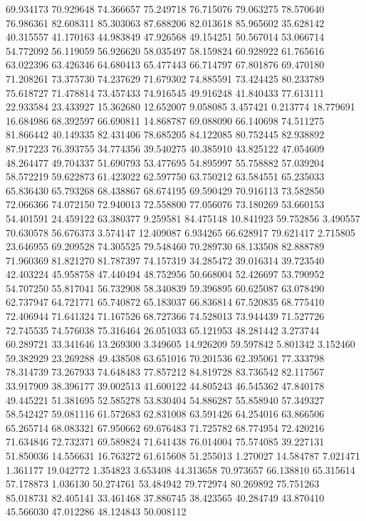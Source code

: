 69.934173
70.929648
74.366657
75.249718
76.715076
79.063275
78.570640
76.986361
82.608311
85.303063
87.688206
82.013618
85.965602
35.628142
40.315557
41.170163
44.983849
47.926568
49.154251
50.567014
53.066714
54.772092
56.119059
56.926620
58.035497
58.159824
60.928922
61.765616
63.022396
63.426346
64.680413
65.477443
66.714797
67.801876
69.470180
71.208261
73.375730
74.237629
71.679302
74.885591
73.424425
80.233789
75.618727
71.478814
73.457433
74.916545
49.916248
41.840433
77.613111
22.933584
23.433927
15.362680
12.652007
9.058085
3.457421
0.213774
18.779691
16.684986
68.392597
66.690811
14.868787
69.088090
66.140698
74.511275
81.866442
40.149335
82.431406
78.685205
84.122085
80.752445
82.938892
87.917223
76.393755
34.774356
39.540275
40.385910
43.825122
47.054609
48.264477
49.704337
51.690793
53.477695
54.895997
55.758882
57.039204
58.572219
59.622873
61.423022
62.597750
63.750212
63.584551
65.235033
65.836430
65.793268
68.438867
68.674195
69.590429
70.916113
73.582850
72.066366
74.072150
72.940013
72.558800
77.056076
73.180269
53.660153
54.401591
24.459122
63.380377
9.259581
84.475148
10.841923
59.752856
3.490557
70.630578
56.676373
3.574147
12.409087
6.934265
66.628917
79.621417
2.715805
23.646955
69.209528
74.305525
79.548460
70.289730
68.133508
82.888789
71.960369
81.821270
81.787397
74.157319
34.285472
39.016314
39.723540
42.403224
45.958758
47.440494
48.752956
50.668004
52.426697
53.790952
54.707250
55.817041
56.732908
58.340839
59.396895
60.625087
63.078490
62.737947
64.721771
65.740872
65.183037
66.836814
67.520835
68.775410
72.406944
71.641324
71.167526
68.727366
74.528013
73.944439
71.527726
72.745535
74.576038
75.316464
26.051033
65.121953
48.281442
3.273744
60.289721
33.341646
13.269300
3.349605
14.926209
59.597842
5.801342
3.152460
59.382929
23.269288
49.438508
63.651016
70.201536
62.395061
77.333798
78.314739
73.267933
74.648483
77.857212
84.819728
83.736542
82.117567
33.917909
38.396177
39.002513
41.600122
44.805243
46.545362
47.840178
49.445221
51.381695
52.585278
53.830404
54.886287
55.858940
57.349327
58.542427
59.081116
61.572683
62.831008
63.591426
64.254016
63.866506
65.265714
68.083321
67.950662
69.676483
71.725782
68.774954
72.420216
71.634846
72.732371
69.589824
71.641438
76.014004
75.574085
39.227131
51.850036
14.556631
16.763272
61.615608
51.255013
1.270027
14.584787
7.021471
1.361177
19.042772
1.354823
3.653408
44.313658
70.973657
66.138810
65.315614
57.178873
1.036130
50.274761
53.484942
79.772974
80.269892
75.751263
85.018731
82.405141
33.461468
37.886745
38.423565
40.284749
43.870410
45.566030
47.012286
48.124843
50.008112

